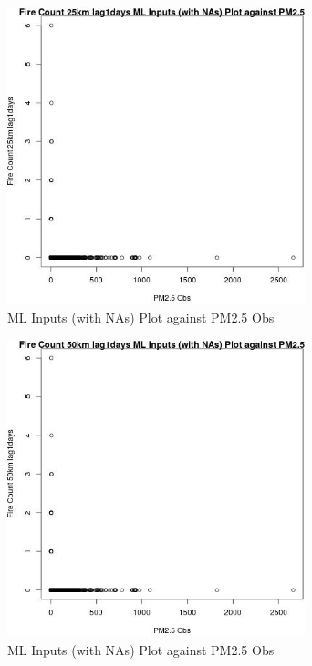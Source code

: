 \begin{figure} 
\centering  
\includegraphics[width=0.77\textwidth]{Code_Outputs/Report_ML_input_PM25_Step4_part_e_de_duplicated_aves_compiled_2019-05-21wNAs_Fire_Count_25km_lag1daysvPM25_Obs.jpg} 
\caption{\label{fig:Report_ML_input_PM25_Step4_part_e_de_duplicated_aves_compiled_2019-05-21wNAsFire_Count_25km_lag1daysvPM25_Obs}ML Inputs (with NAs) Plot against PM2.5 Obs} 
\end{figure} 
 

\begin{figure} 
\centering  
\includegraphics[width=0.77\textwidth]{Code_Outputs/Report_ML_input_PM25_Step4_part_e_de_duplicated_aves_compiled_2019-05-21wNAs_Fire_Count_50km_lag1daysvPM25_Obs.jpg} 
\caption{\label{fig:Report_ML_input_PM25_Step4_part_e_de_duplicated_aves_compiled_2019-05-21wNAsFire_Count_50km_lag1daysvPM25_Obs}ML Inputs (with NAs) Plot against PM2.5 Obs} 
\end{figure} 
 

